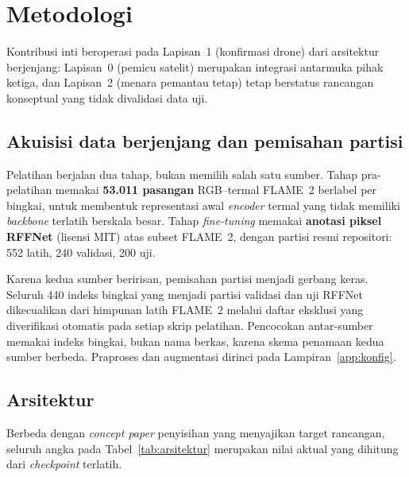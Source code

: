 
\section{Metodologi}

Kontribusi inti beroperasi pada Lapisan~1 (konfirmasi drone) dari arsitektur
berjenjang: Lapisan~0 (pemicu satelit) merupakan integrasi antarmuka pihak
ketiga, dan Lapisan~2 (menara pemantau tetap) tetap berstatus rancangan
konseptual yang tidak divalidasi data uji.

\subsection{Akuisisi data berjenjang dan pemisahan partisi}

Pelatihan berjalan dua tahap, bukan memilih salah satu sumber. Tahap
pra-pelatihan memakai \textbf{53.011 pasangan} RGB--termal FLAME~2
\cite{flame2_2022} berlabel per bingkai, untuk membentuk representasi awal
\emph{encoder} termal yang tidak memiliki \emph{backbone} terlatih berskala
besar. Tahap \emph{fine-tuning} memakai \textbf{anotasi piksel RFFNet}
\cite{rffnet2026} (lisensi MIT) atas subset FLAME~2, dengan partisi resmi
repositori: 552 latih, 240 validasi, 200 uji.

Karena kedua sumber beririsan, pemisahan partisi menjadi gerbang keras. Seluruh
440 indeks bingkai yang menjadi partisi validasi dan uji RFFNet dikecualikan
dari himpunan latih FLAME~2 melalui daftar eksklusi yang diverifikasi otomatis
pada setiap skrip pelatihan. Pencocokan antar-sumber memakai indeks bingkai,
bukan nama berkas, karena skema penamaan kedua sumber berbeda. Praproses dan
augmentasi dirinci pada Lampiran~\ref{app:konfig}.

\subsection{Arsitektur}

Berbeda dengan \emph{concept paper} penyisihan yang menyajikan target rancangan,
seluruh angka pada Tabel~\ref{tab:arsitektur} merupakan nilai aktual yang
dihitung dari \emph{checkpoint} terlatih.

